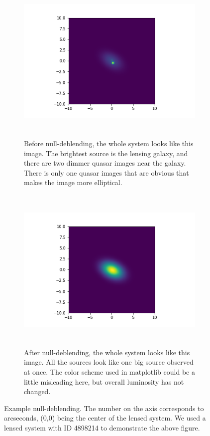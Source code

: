 \documentclass[\docopts]{\docclass}
\begin{document}
\begin{figure}
    \centering
    \begin{subfigure}[bt]{0.48\linewidth}        %
        \centering
        \includegraphics[width=\linewidth, height=8cm]{beforenulldeblend.png}
        \caption{Before null-deblending, the whole system looks like this image. The brightest source is the lensing galaxy, and there are two dimmer quasar images near the galaxy. There is only one quasar images that are obvious that makes the image more elliptical.}
    \end{subfigure}
    \begin{subfigure}[bt]{0.48\linewidth}        %
        \centering
        \includegraphics[width=\linewidth, height=8cm]{afternulldeblend.png}
        \caption{After null-deblending, the whole system looks like this image. All the sources look like one big source observed at once.                                                                                                                                                                                 The color scheme used in matplotlib could be a little misleading here, but overall luminosity has not changed.}
    \end{subfigure}
    \caption{Example null-deblending. The number on the axis corresponds to arcseconds, (0,0) being the center of the lensed system. We used a lensed system with ID 4898214 to demonstrate the above figure. } 
    \label{fig:null-deblend}
\end{figure}
\end{document}
